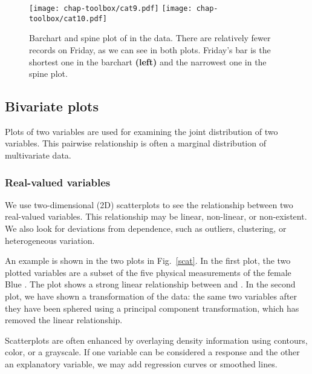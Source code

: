 \begin{figure}[htp]
\centerline{
 {\texttt{[image: chap-toolbox/cat9.pdf]}}
 {\texttt{[image: chap-toolbox/cat10.pdf]}}}
\caption[Barchart and spine plot of the  data] {Barchart
and spine plot of  in the  data.  There are
relatively fewer records on Friday, as we can see in both plots.
Friday's bar is the shortest one in the barchart {\bf (left)} and the
narrowest one in the spine plot.}
\label{barchart} 
\end{figure}

\subsection{Bivariate plots}


Plots of two variables are used for examining the joint distribution
of two variables. This pairwise relationship is often a marginal
distribution of multivariate data.

\subsubsection{Real-valued variables}


We use two-dimensional (2D) scatterplots to see the relationship
between two real-valued variables.  This relationship may be linear,
non-linear, or non-existent.  We also look for deviations from
dependence, such as outliers, clustering, or heterogeneous variation.

An example is shown in the two plots in Fig.~\ref{scat}.  In the first
plot, the two plotted variables are a subset of the five physical
measurements of the female Blue .  The plot
shows a strong linear relationship between  and
.  In the second plot, we have shown a
transformation of the data: the same two variables after they have
been sphered using a principal component transformation, which has
removed the linear relationship.

Scatterplots are often enhanced by overlaying density information
using contours, color, or a grayscale. If one variable can be
considered a response and the other an explanatory variable, we may
add regression curves or smoothed lines.

